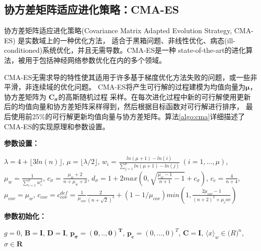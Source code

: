 \subsection{协方差矩阵适应进化策略：CMA-ES}

协方差矩阵适应进化策略(Covariance Matrix Adapted Evolution Strategy, CMA-ES) 是实数域上的一种优化方法，
适合于黑箱问题、非线性优化、病态(ill-conditioned)系统优化，并且无需导数\cite{cmapaper}。CMA-ES是一种
state-of-the-art的进化算法，被用于包括神经网络参数优化\cite{nn2016cma}在内的多个领域。


CMA-ES无需求导的特性使其适用于许多基于梯度优化方法失败的问题，或一些非平滑，非连续域的优化问题。
CMA-ES将产生可行解的过程建模为均值向量为$\mathbf{\mu}$，协方差矩阵为 $\mathbf{C_{\sigma}}$的高斯随机过程
采样。在每次进化过程中新的可行解使用更新后的均值向量和协方差矩阵采样得到，然后根据目标函数对可行解进行排序，
最后使用前25\%的可行解更新均值向量与协方差矩阵。算法\ref{algo:cma}详细描述了CMA-ES的实现原理和参数设置。


{\bf 参数设置：}

$\lambda = 4 + \lfloor 3 ln(n) \rfloor$, $\mu = \lfloor \lambda / 2\rfloor$,
$w_i = \frac{ln(\mu+1) - ln(i) }{\sum_{j=1}^{\mu}ln(\mu+1)-ln(j) } \ (i=1,...,\mu) $, 
$\mu_w = \frac{1}{\sum_{i=1}^{\mu} w_i^2}$, 
$c_\sigma = \frac{\mu_w + 2}{n + \mu_w + 3}$,
$d_\sigma =  1 + 2 max (0, \sqrt{\frac{\mu_w-1}{n+1}-1} + c_\sigma)$,
$c_c = \frac{4}{n+4}$, $\mu_{cov} = \mu_w$, 
$c_{cov} = c_{cov}^{def} = \frac{1}{\mu_{cov}} \frac{2}{(n+\sqrt{2})^2} + (1 - 1/\mu_{cov}) min (1, \frac{2\mu_{cov}-1}{(n+2)^2+\mu_cov})$


{\bf 参数初始化：}

$g=0$, $\mathbf{B=I}$, $\mathbf{D=I}$, $\mathbf{p_\sigma=(0,..,0)^T}$,
$\mathbf{p_c} = (0,...,0)^T$, $\mathbf{C=I}$, $\langle x \rangle_w \in \mathbb(R)^n$,
$\sigma \in \mathbf{R}$


